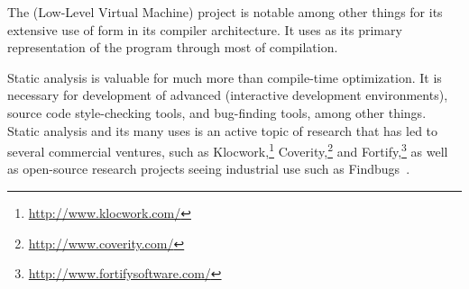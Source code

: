 The  (Low-Level Virtual Machine) project \citep{Lattner:LLVM:2002} is notable among other things for its extensive use of \SSA form in its compiler architecture. It uses \SSA as its primary representation of the program through most of compilation.

Static analysis is valuable for much more than compile-time optimization. It is necessary for development of advanced  (interactive development environments), source code style-checking tools, and bug-finding tools, among other things. Static analysis and its many uses is an active topic of research that has led to several commercial ventures, such as Klocwork,\footnote{\url{http://www.klocwork.com/}} Coverity,\footnote{\url{http://www.coverity.com/}} and Fortify,\footnote{\url{http://www.fortifysoftware.com/}} as well as open-source research projects seeing industrial use such as Findbugs~\citep{Hovemeyer:Finding:2004}.